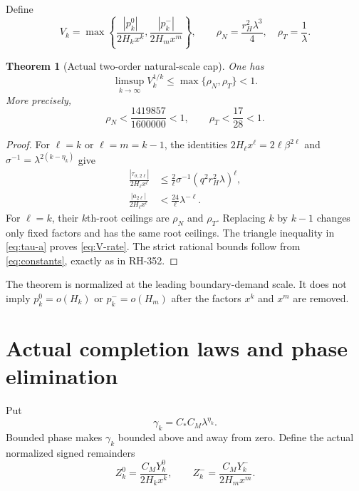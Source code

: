 \documentclass[11pt]{article}
\newtheorem{theorem}{Theorem}[section]
\theoremstyle{remark}
\begin{document}
Define
\begin{equation}\label{eq:V}
 V_k=\max\left\{
 \frac{|p_k^0|}{2H_kx^k},
 \frac{|p_k^-|}{2H_mx^m}
 \right\},
 \qquad
 \rho_N=\frac{r_H^2\lambda^3}{4},
 \quad \rho_T=\frac1\lambda.
\end{equation}

\begin{theorem}[Actual two-order natural-scale cap]\label{thm:cap}
One has
\begin{equation}\label{eq:V-rate}
 \boxed{
 \limsup_{k\to\infty}V_k^{1/k}
 \le\max\{\rho_N,\rho_T\}<1.}
\end{equation}
More precisely,
\begin{equation}\label{eq:rate-certificates}
 \rho_N<\frac{1419857}{1600000}<1,
 \qquad \rho_T<\frac{17}{28}<1.
\end{equation}
\end{theorem}

\begin{proof}
For $\ell=k$ or $\ell=m=k-1$, the identities
$2H_\ell x^\ell=2\ell\beta^{2\ell}$ and
$\sigma^{-1}=\lambda^{2(k-\eta_k)}$ give
\begin{align}
 \frac{|\tau_{\sigma,2\ell}|}{2H_\ell x^\ell}
 &\le \frac{2}{\ell}\sigma^{-1}
 (q^2r_H^2\lambda)^\ell,
 \label{eq:noisy-bound}\\
 \frac{|a_{2\ell}|}{2H_\ell x^\ell}
 &<\frac{24}{\ell}\lambda^{-\ell}.
 \label{eq:target-bound}
\end{align}
For $\ell=k$, their $k$th-root ceilings are $\rho_N$ and $\rho_T$.
Replacing $k$ by $k-1$ changes only fixed factors and has the same root
ceilings.  The triangle inequality in \eqref{eq:tau-a} proves
\eqref{eq:V-rate}.  The strict rational bounds follow from
\eqref{eq:constants}, exactly as in RH-352.
\end{proof}

The theorem is normalized at the leading boundary-demand scale.  It does
not imply $p_k^0=o(H_k)$ or $p_k^-=o(H_m)$ after the factors $x^k$ and
$x^m$ are removed.

\section{Actual completion laws and phase elimination}

Put
\begin{equation}\label{eq:gamma}
 \gamma_k=C_*C_M\lambda^{\eta_k}.
\end{equation}
Bounded phase makes $\gamma_k$ bounded above and away from zero.  Define the
actual normalized signed remainders
\begin{equation}\label{eq:Z}
 Z_k^0=\frac{C_MY_k^0}{2H_kx^k},
 \qquad
 Z_k^-=\frac{C_MY_k^-}{2H_mx^m}.
\end{equation}
\end{document}
